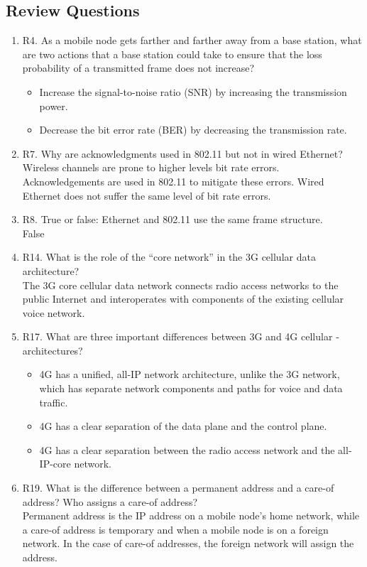 \documentclass[12pt]{article}
\begin{document}
\subsection*{Review Questions}
\begin{enumerate}
\item R4. As a mobile node gets farther and farther away from a base station, what are two actions that a base station could take to ensure that the loss probability of a transmitted frame does not
increase?
\begin{itemize}
	\item Increase the signal-to-noise ratio (SNR) by increasing the transmission power.
	\item Decrease the bit error rate (BER) by decreasing the transmission rate.
\end{itemize}
\item R7. Why are acknowledgments used in 802.11 but not in wired Ethernet?\\[1em]
Wireless channels are prone to higher levels bit rate errors. Acknowledgements are used in 802.11 to mitigate these errors. Wired Ethernet does not suffer the same level of bit rate errors.
\item R8. True or false: Ethernet and 802.11 use the same frame structure.\\[1em]
False
\item R14. What is the role of the “core network” in the 3G cellular data architecture?\\[1em]
The 3G core cellular data network connects radio access networks to the public Internet and interoperates with components of the existing cellular voice network.
\item R17. What are three important differences between 3G and 4G cellular ­architectures?
\begin{itemize}
	\item 4G has a unified, all-IP network architecture, unlike the 3G network, which has separate network components and paths for voice and data traffic.
	\item 4G has a clear separation of the data plane and the control plane.
	\item 4G has a clear separation between the radio access network and the all-IP-core ­network.
\end{itemize}
\item R19. What is the difference between a permanent address and a care-of address? Who assigns a care-of address?\\[1em]
Permanent address is the IP address on a mobile node's home network, while a care-of address is temporary and when a mobile node is on a foreign network. In the case of care-of addresses, the foreign network will assign the address.

\end{enumerate}
\end{document}

